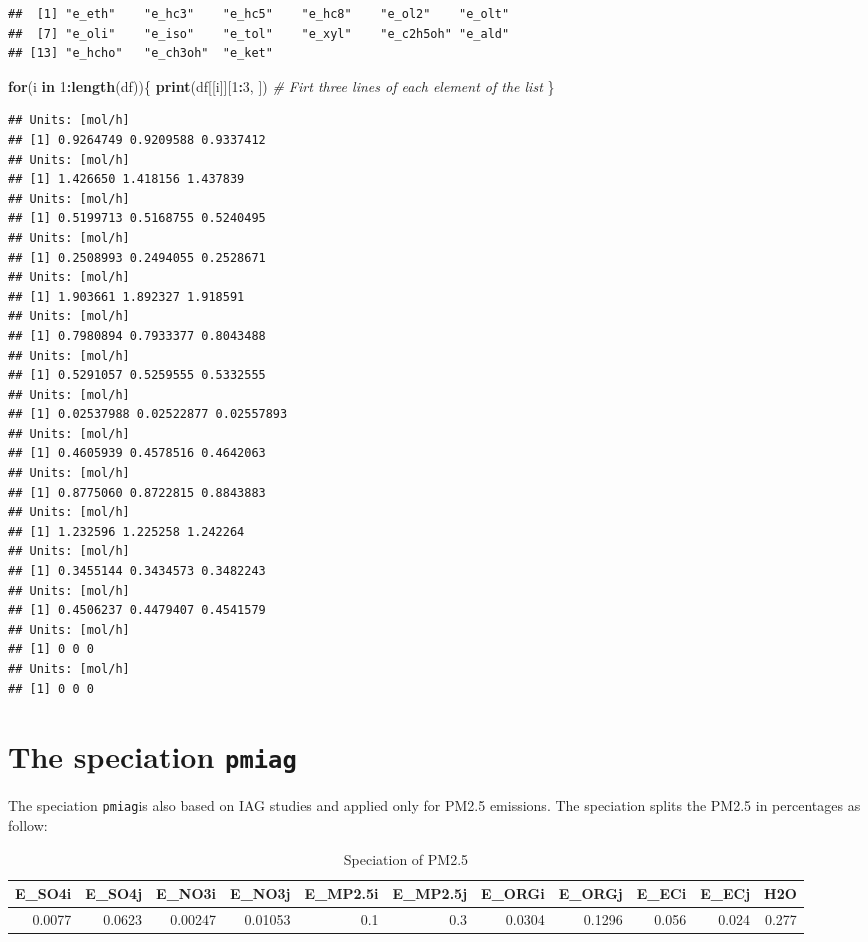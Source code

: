 \documentclass[12pt,graybox,envcountchap,sectrefs]{krantz}
\makeatletter
\newenvironment{Shaded}{\begin{snugshade}}{\end{snugshade}}
\newcommand{\KeywordTok}[1]{\textcolor[rgb]{0.13,0.29,0.53}{\textbf{#1}}}
\newcommand{\DecValTok}[1]{\textcolor[rgb]{0.00,0.00,0.81}{#1}}
\newcommand{\CommentTok}[1]{\textcolor[rgb]{0.56,0.35,0.01}{\textit{#1}}}
\newcommand{\ControlFlowTok}[1]{\textcolor[rgb]{0.13,0.29,0.53}{\textbf{#1}}}
\newcommand{\OperatorTok}[1]{\textcolor[rgb]{0.81,0.36,0.00}{\textbf{#1}}}
\newcommand{\NormalTok}[1]{#1}
\newenvironment{kframe}{%
\medskip{}
\setlength{\fboxsep}{.8em}
 \def\at@end@of@kframe{}%
 \ifinner\ifhmode%
  \def\at@end@of@kframe{\end{minipage}}%
  \begin{minipage}{\columnwidth}%
 \fi\fi%
 \def\FrameCommand##1{\hskip\@totalleftmargin \hskip-\fboxsep
 \colorbox{shadecolor}{##1}\hskip-\fboxsep
     \hskip-\linewidth \hskip-\@totalleftmargin \hskip\columnwidth}%
 \MakeFramed {\advance\hsize-\width
   \@totalleftmargin\z@ \linewidth\hsize
   \@setminipage}}%
 {\par\unskip\endMakeFramed%
 \at@end@of@kframe}
\renewenvironment{Shaded}{\begin{kframe}}{\end{kframe}}
\theoremstyle{definition}
\theoremstyle{definition}
\theoremstyle{definition}
\theoremstyle{remark}
\makeatother
\begin{document}
\begin{verbatim}
##  [1] "e_eth"    "e_hc3"    "e_hc5"    "e_hc8"    "e_ol2"    "e_olt"   
##  [7] "e_oli"    "e_iso"    "e_tol"    "e_xyl"    "e_c2h5oh" "e_ald"   
## [13] "e_hcho"   "e_ch3oh"  "e_ket"
\end{verbatim}

\begin{Shaded}
\begin{Highlighting}[]
\ControlFlowTok{for}\NormalTok{(i }\ControlFlowTok{in} \DecValTok{1}\OperatorTok{:}\KeywordTok{length}\NormalTok{(df))\{}
  \KeywordTok{print}\NormalTok{(df[[i]][}\DecValTok{1}\OperatorTok{:}\DecValTok{3}\NormalTok{, ]) }\CommentTok{# Firt three lines of each element of the list}
\NormalTok{\}}
\end{Highlighting}
\end{Shaded}

\begin{verbatim}
## Units: [mol/h]
## [1] 0.9264749 0.9209588 0.9337412
## Units: [mol/h]
## [1] 1.426650 1.418156 1.437839
## Units: [mol/h]
## [1] 0.5199713 0.5168755 0.5240495
## Units: [mol/h]
## [1] 0.2508993 0.2494055 0.2528671
## Units: [mol/h]
## [1] 1.903661 1.892327 1.918591
## Units: [mol/h]
## [1] 0.7980894 0.7933377 0.8043488
## Units: [mol/h]
## [1] 0.5291057 0.5259555 0.5332555
## Units: [mol/h]
## [1] 0.02537988 0.02522877 0.02557893
## Units: [mol/h]
## [1] 0.4605939 0.4578516 0.4642063
## Units: [mol/h]
## [1] 0.8775060 0.8722815 0.8843883
## Units: [mol/h]
## [1] 1.232596 1.225258 1.242264
## Units: [mol/h]
## [1] 0.3455144 0.3434573 0.3482243
## Units: [mol/h]
## [1] 0.4506237 0.4479407 0.4541579
## Units: [mol/h]
## [1] 0 0 0
## Units: [mol/h]
## [1] 0 0 0
\end{verbatim}

\section{\texorpdfstring{The speciation
\texttt{pmiag}}{The speciation pmiag}}\label{the-speciation-pmiag}

The speciation \texttt{pmiag}is also based on IAG studies and applied
only for PM2.5 emissions. The speciation splits the PM2.5 in percentages
as follow:

\begin{table}

\caption{\label{tab:unnamed-chunk-93}Speciation of PM2.5}
\centering
\begin{tabular}[t]{r|r|r|r|r|r|r|r|r|r|r}
\hline
E\_SO4i & E\_SO4j & E\_NO3i & E\_NO3j & E\_MP2.5i & E\_MP2.5j & E\_ORGi & E\_ORGj & E\_ECi & E\_ECj & H2O\\
\hline
0.0077 & 0.0623 & 0.00247 & 0.01053 & 0.1 & 0.3 & 0.0304 & 0.1296 & 0.056 & 0.024 & 0.277\\
\hline
\end{tabular}
\end{table}
\end{document}
